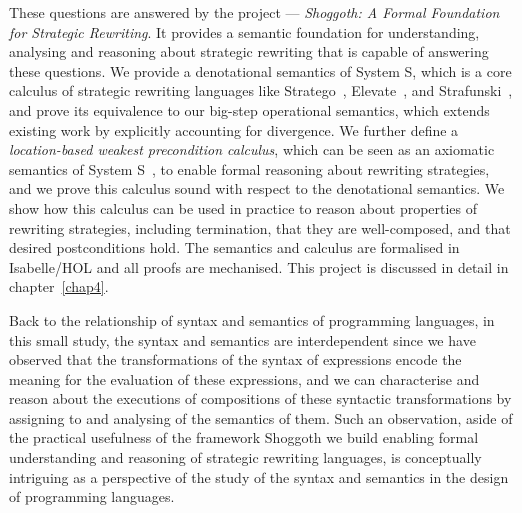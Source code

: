 These questions are answered by the project --- \emph{Shoggoth: A Formal Foundation for Strategic Rewriting}. It provides a semantic foundation for understanding, analysing and reasoning about strategic rewriting that is capable of answering these questions.
We provide a denotational semantics of System S, which is a core calculus of strategic rewriting languages like Stratego~\citep{DBLP:conf/icfp/VisserBT98,10.1007/3-540-45127-7_27}, Elevate~\citep{DBLP:journals/cacm/HagedornLKQGS23,DBLP:journals/pacmpl/HagedornLKQGS20}, and Strafunski~\citep{DBLP:conf/rule/LammelV02}, and prove its equivalence to our big-step operational semantics, which extends existing work by explicitly accounting for divergence.
We further define a \emph{location-based weakest precondition calculus}, which can be seen as an axiomatic semantics of System S~\cite{VISSER1998422}, to enable formal reasoning about rewriting strategies, and we prove this calculus sound with respect to the denotational semantics.
We show how this calculus can be used in practice to reason about properties of rewriting strategies, including termination, that they are well-composed, and that desired postconditions hold.
The semantics and calculus are formalised in Isabelle/HOL and all proofs are mechanised. This project is discussed in detail in chapter~\ref{chap4}.

Back to the relationship of syntax and semantics of programming languages, in this small study, the syntax and semantics are interdependent since we have observed that the transformations of the syntax of expressions encode the meaning for the evaluation of these expressions, and we can characterise and reason about the executions of compositions of these syntactic transformations by assigning to and analysing of the semantics of them. Such an observation, aside of the practical usefulness of the framework Shoggoth we build enabling formal understanding and reasoning of strategic rewriting languages, is conceptually intriguing as a perspective of the study of the syntax and semantics in the design of programming languages.

